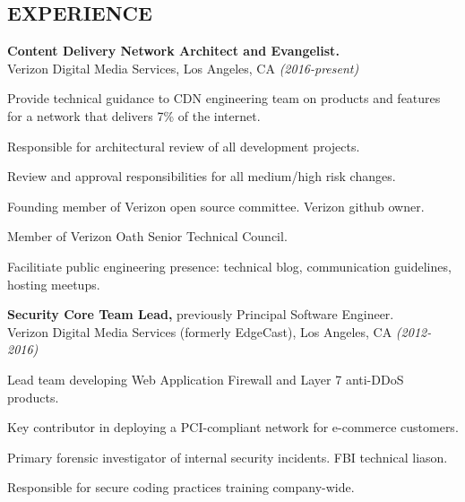 \documentclass[margin]{res}
\begin{document}
\begin{resume}
\section{EXPERIENCE}
\noindent
{\bf Content Delivery Network Architect and Evangelist.}\\
Verizon Digital Media Services, Los Angeles, CA {\em (2016-present)}
\begin{list}{}{\leftmargin=1.5em \topsep=5pt \partopsep=0pt \parsep=2.5pt}
  \item Provide technical guidance to CDN engineering team on products and features for a network that delivers 7\% of the internet.
  \item Responsible for architectural review of all development projects.
  \item Review and approval responsibilities for all medium/high risk changes.
  \item Founding member of Verizon open source committee.  Verizon github owner.
  \item Member of Verizon Oath Senior Technical Council.
  \item Facilitiate public engineering presence: technical blog, communication guidelines, hosting meetups.
\end{list}

{\bf Security Core Team Lead,} previously Principal Software Engineer.\\
Verizon Digital Media Services (formerly EdgeCast), Los Angeles, CA {\em (2012-2016)}
\begin{list}{}{\leftmargin=1.5em \topsep=5pt \partopsep=0pt \parsep=2.5pt}
  \item Lead team developing Web Application Firewall and Layer 7
    anti-DDoS products.
  \item Key contributor in deploying a PCI-compliant network for e-commerce customers.
  \item Primary forensic investigator of internal security incidents.
    FBI technical liason.
  \item Responsible for secure coding practices training company-wide.
\end{list}


\end{resume}
\end{document}
